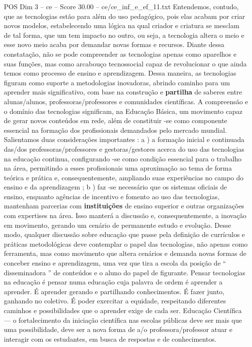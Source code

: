 \begin{textsample}{POS Dim 3 – ce – Score 30.00 – ce/ce\_inf\_e\_ef\_11.txt}
Entendemos, contudo, que as tecnologias estão para além do uso pedagógico, pois elas acabam por criar novos modelos, estabelecendo uma lógica na qual criador e criatura se mesclam de tal forma, que um tem impacto no outro, ou seja, a tecnologia altera o meio e esse novo meio acaba por demandar novas formas e recursos.
Diante dessa constatação, não se pode compreender as tecnologias apenas como aparelhos e suas funções, mas como arcabouço tecnossocial capaz de revolucionar o que ainda temos como processo de ensino e aprendizagem.
Dessa maneira, as tecnologias figuram como suporte a metodologias inovadoras, abrindo caminho para um aprender mais significativo, com base na construção e \textbf{partilha} de saberes entre alunas/alunos, professoras/professores e comunidades científicas.
A compreensão e o domínio das tecnologias significam, na Educação Básica, um movimento capaz de gerar novos conteúdos em rede, além de constituir -se como componente essencial na formação dos profissionais demandados pelo mercado mundial.
Salientamos duas considerações importantes : a ) a formação inicial e continuada das/dos professoras/professores e gestoras/gestores acerca do uso das tecnologias na educação continua, configurando -se como condição essencial para o trabalho na área, permitindo a esses profissionais uma aproximação ao tema de forma teórica e prática e, consequentemente, ampliando suas experiências no campo do ensino e da aprendizagem ; b ) faz -se necessário que os sistemas oficiais de ensino, enquanto agências de incentivo e fomento ao uso das tecnologias, mantenham parcerias com \textbf{instituições} de ensino superior e outras organizações com expertises na área.
Isso manterá a discussão e, consequentemente, a inovação em movimento, gerando um cenário de permanente estudo e evolução.
Desse modo, qualquer discussão sobre educação que passe pela definição de currículos e práticas metodológicas deve contemplar o papel das tecnologias, não apenas como ferramenta, mas como movimento que altera cenários e demanda novas formas de conceber ensino e aprendizagem, uma vez que tira a escola da posição de “ disseminadora ” de conteúdos e o aluno do papel de figurante.
Pensar tecnologias na educação é pensar numa educação cuja palavra de ordem é aprender a aprender.
É aprender gerando e partilhando conhecimentos.
É fazer junto, ganhando no coletivo.
É poder exercitar a equidade, respeitando diferentes caminhos e possibilidades que o aprender exige de cada ser.
Educação Científica — o fortalecimento da iniciação científica nas escolas públicas deve ser mais que uma possibilidade, deve ser a nova forma de a/o professora/professor atuar e interagir com os estudantes, em busca de respostas e de conhecimentos.

\end{textsample}

